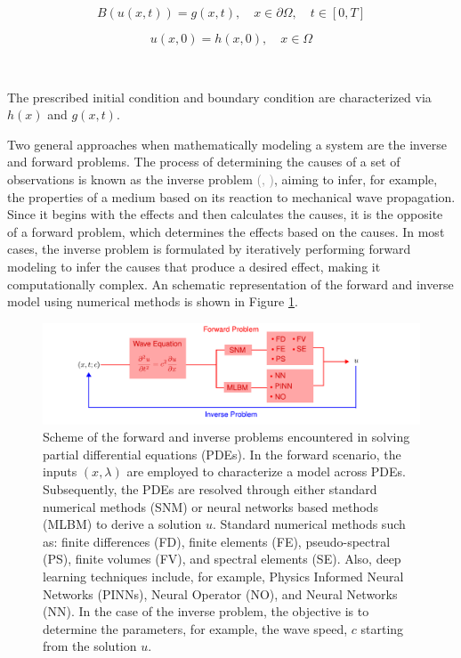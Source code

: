 \documentclass{tufte-handout}
\renewcommand{\citep}[2][]{\textcolor{gray}{(\citeauthor{#2}, \citeyear[#1]{#2})}}
\begin{document}
\begin{equation}
B (u(x, t)) = g(x, t), \quad x \in \partial \Omega, \quad t \in [0, T] 
\end{equation}

\begin{equation}
u(x, 0) = h(x, 0), \quad x \in \Omega
\end{equation}

\

The prescribed initial condition and boundary condition are characterized via $h(x)$ and $g(x, t)$.

Two general approaches when mathematically modeling a system are the inverse and forward problems. The process of determining the causes of a set of observations is known as the inverse problem \citep{Tarantola}, aiming to infer, for example, the properties of a medium based on its reaction to mechanical wave propagation. Since it begins with the effects and then calculates the causes, it is the opposite of a forward problem, which determines the effects based on the causes. In most cases, the inverse problem is formulated by iteratively performing forward modeling to infer the causes that produce a desired effect, making it computationally complex. An schematic representation of the forward and inverse model using numerical methods is shown in Figure \ref{fig:forward_inverse}.

\begin{figure}[tb!]
\includegraphics{figs/Forward_Inverse_Modeling_Waves.pdf}
    \caption{Scheme of the forward and inverse problems encountered in solving partial differential equations (PDEs). In the forward scenario, the inputs $(x,\lambda)$ are employed to characterize a model across PDEs. Subsequently, the PDEs are resolved through either standard numerical methods (SNM) or neural networks based methods (MLBM) to derive a solution $u$. Standard numerical methods such as: finite differences (FD), finite elements (FE), pseudo-spectral (PS), finite volumes (FV), and spectral elements (SE). Also, deep learning techniques include, for example, Physics Informed Neural Networks (PINNs), Neural Operator (NO), and Neural Networks (NN). In the case of the inverse problem, the objective is to determine the parameters, for example, the wave speed, $c$ starting from the solution $u$.}
    \label{fig:forward_inverse}
\end{figure}
\end{document}
